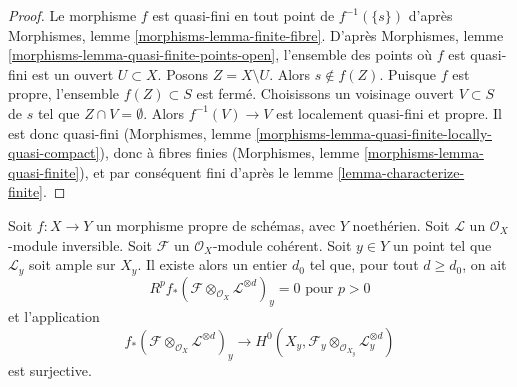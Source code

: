 \begin{proof}
Le morphisme $f$ est quasi-fini en tout point de $f^{-1}(\{s\})$
d'après Morphismes, lemme \ref{morphisms-lemma-finite-fibre}.
D'après Morphismes, lemme \ref{morphisms-lemma-quasi-finite-points-open},
l'ensemble des points où $f$ est quasi-fini est un ouvert $U \subset X$.
Posons $Z = X \setminus U$. Alors $s \not \in f(Z)$. Puisque $f$ est propre,
l'ensemble $f(Z) \subset S$ est fermé. Choisissons un voisinage ouvert
$V \subset S$ de $s$ tel que $Z \cap V = \emptyset$. Alors
$f^{-1}(V) \to V$ est localement quasi-fini et propre.
Il est donc quasi-fini
(Morphismes, lemme \ref{morphisms-lemma-quasi-finite-locally-quasi-compact}),
donc à fibres finies
(Morphismes, lemme \ref{morphisms-lemma-quasi-finite}), et par
conséquent fini d'après le lemme \ref{lemma-characterize-finite}.
\end{proof}

\begin{lemma}
\label{lemma-ample-on-fibre}
Soit $f : X \to Y$ un morphisme propre de schémas, avec $Y$ noethérien.
Soit $\mathcal{L}$ un $\mathcal{O}_X$-module inversible.
Soit $\mathcal{F}$ un $\mathcal{O}_X$-module cohérent.
Soit $y \in Y$ un point tel que $\mathcal{L}_y$ soit ample sur $X_y$.
Il existe alors un entier $d_0$ tel que, pour tout $d \geq d_0$, on ait
$$
R^pf_*(\mathcal{F} \otimes_{\mathcal{O}_X} \mathcal{L}^{\otimes d})_y = 0
\text{ pour }p > 0
$$
et l'application
$$
f_*(\mathcal{F} \otimes_{\mathcal{O}_X} \mathcal{L}^{\otimes d})_y
\longrightarrow
H^0(X_y, \mathcal{F}_y \otimes_{\mathcal{O}_{X_y}} \mathcal{L}_y^{\otimes d})
$$
est surjective.
\end{lemma}

